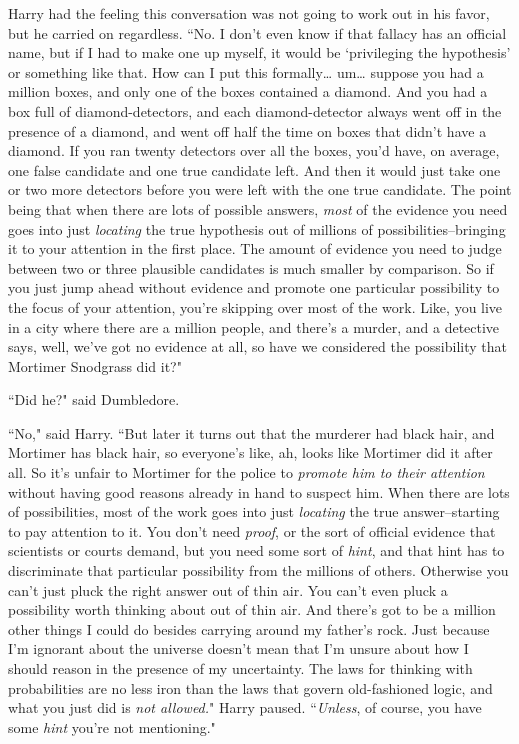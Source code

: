 Harry had the feeling this conversation was not going to work out in his favor, but he carried on regardless. ``No. I don't even know if that fallacy has an official name, but if I had to make one up myself, it would be `privileging the hypothesis' or something like that. How can I put this formally{\ldots} um{\ldots} suppose you had a million boxes, and only one of the boxes contained a diamond. And you had a box full of diamond-detectors, and each diamond-detector always went off in the presence of a diamond, and went off half the time on boxes that didn't have a diamond. If you ran twenty detectors over all the boxes, you'd have, on average, one false candidate and one true candidate left. And then it would just take one or two more detectors before you were left with the one true candidate. The point being that when there are lots of possible answers, \emph{most} of the evidence you need goes into just \emph{locating} the true hypothesis out of millions of possibilities\---bringing it to your attention in the first place. The amount of evidence you need to judge between two or three plausible candidates is much smaller by comparison. So if you just jump ahead without evidence and promote one particular possibility to the focus of your attention, you're skipping over most of the work. Like, you live in a city where there are a million people, and there's a murder, and a detective says, well, we've got no evidence at all, so have we considered the possibility that Mortimer Snodgrass did it?"

``Did he?" said Dumbledore.

``No," said Harry. ``But later it turns out that the murderer had black hair, and Mortimer has black hair, so everyone's like, ah, looks like Mortimer did it after all. So it's unfair to Mortimer for the police to \emph{promote him to their attention} without having good reasons already in hand to suspect him. When there are lots of possibilities, most of the work goes into just \emph{locating} the true answer\---starting to pay attention to it. You don't need \emph{proof}, or the sort of official evidence that scientists or courts demand, but you need some sort of \emph{hint}, and that hint has to discriminate that particular possibility from the millions of others. Otherwise you can't just pluck the right answer out of thin air. You can't even pluck a possibility worth thinking about out of thin air. And there's got to be a million other things I could do besides carrying around my father's rock. Just because I'm ignorant about the universe doesn't mean that I'm unsure about how I should reason in the presence of my uncertainty. The laws for thinking with probabilities are no less iron than the laws that govern old-fashioned logic, and what you just did is \emph{not allowed.}" Harry paused. ``\emph{Unless}, of course, you have some \emph{hint} you're not mentioning."

